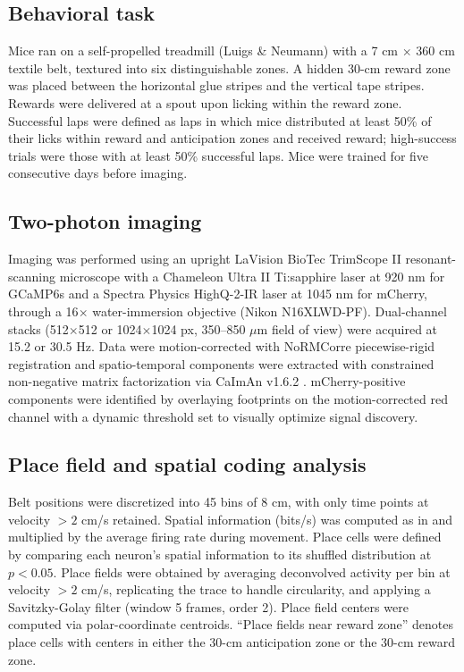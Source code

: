 \documentclass[11pt]{article}
\begin{document}
\subsection{Behavioral task}

Mice ran on a self-propelled treadmill (Luigs \& Neumann) with a 7 cm $\times$ 360 cm textile belt, textured into six distinguishable zones. A hidden 30-cm reward zone was placed between the horizontal glue stripes and the vertical tape stripes. Rewards were delivered at a spout upon licking within the reward zone. Successful laps were defined as laps in which mice distributed at least 50\% of their licks within reward and anticipation zones and received reward; high-success trials were those with at least 50\% successful laps. Mice were trained for five consecutive days before imaging.

\subsection{Two-photon imaging}

Imaging was performed using an upright LaVision BioTec TrimScope II resonant-scanning microscope with a Chameleon Ultra II Ti:sapphire laser at 920 nm for GCaMP6s and a Spectra Physics HighQ-2-IR laser at 1045 nm for mCherry, through a 16$\times$ water-immersion objective (Nikon N16XLWD-PF). Dual-channel stacks (512$\times$512 or 1024$\times$1024 px, 350--850 $\mu$m field of view) were acquired at 15.2 or 30.5 Hz. Data were motion-corrected with NoRMCorre piecewise-rigid registration \citep{Pnevmatikakis2017NoRMCorre} and spatio-temporal components were extracted with constrained non-negative matrix factorization via CaImAn v1.6.2 \citep{Giovannucci2019CaImAn}. mCherry-positive components were identified by overlaying footprints on the motion-corrected red channel with a dynamic threshold set to visually optimize signal discovery.

\subsection{Place field and spatial coding analysis}

Belt positions were discretized into 45 bins of 8 cm, with only time points at velocity $>2$ cm/s retained. Spatial information (bits/s) was computed as in \citet{Skaggs1993Information} and multiplied by the average firing rate during movement. Place cells were defined by comparing each neuron's spatial information to its shuffled distribution at $p<0.05$. Place fields were obtained by averaging deconvolved activity per bin at velocity $>2$ cm/s, replicating the trace to handle circularity, and applying a Savitzky-Golay filter (window 5 frames, order 2). Place field centers were computed via polar-coordinate centroids. ``Place fields near reward zone'' denotes place cells with centers in either the 30-cm anticipation zone or the 30-cm reward zone.
\end{document}
